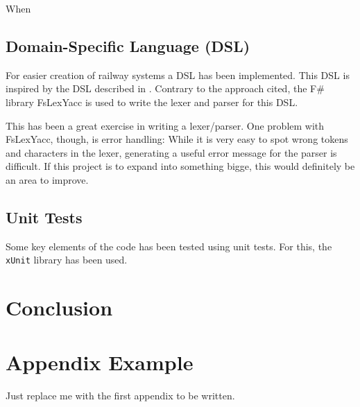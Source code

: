 \documentclass[a4paper, 12pt, twoside]{report}
\begin{document}
When 


\section{Domain-Specific Language (DSL)} %
\label{sec:domain-specific-language}

For easier creation of railway systems a DSL has been implemented. This DSL is inspired by the DSL described in \cite{kasting2016b}. Contrary to the approach cited, the F\# library FsLexYacc is used to write the lexer and parser for this DSL. 

This has been a great exercise in writing a lexer/parser. One problem with FsLexYacc, though, is error handling: While it is very easy to spot wrong tokens and characters in the lexer, generating a useful error message for the parser is difficult. If this project is to expand into something bigge, this would definitely be an area to improve. 


\section{Unit Tests} %
\label{sec:unit-tests}

Some key elements of the code has been tested using unit tests. For this, the \texttt{xUnit} library has been used.  


\chapter{Conclusion} %
\label{chpt:conclusion}



\cleardoublepage
\appendix

\chapter{Appendix Example} %
\label{app:example}

Just replace me with the first appendix to be written. 



\cleardoublepage
{}


\end{document}
